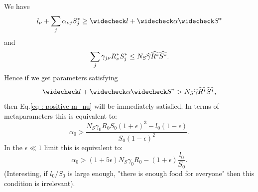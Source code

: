 \documentclass[12pt, titlepage]{report}
\begin{document}
We have
\begin{equation}
  l_\nu + \sum_{j} \alpha_{\nu j} S^*_j \geq \mind{l} + \mind{\alpha} \mind{S^*}
\end{equation}
and
\begin{equation}
  \sum_j \gamma_{j\nu}R^*_\nu S^*_j \leq N_S \widehat{\gamma}\widehat{R^*}\widehat{S^*}.
\end{equation}
Hence if we get parameters satisfying
\begin{equation}
  \mind{l}+\mind{\alpha}\mind{S^*} > N_S \maxd{\gamma}\maxd{R^*}\maxd{S^*},
\end{equation}
then Eq.\eqref{eq : positive m_nu} will be immediately satisfied. In terms of metaparameters this is equivalent to:
\begin{equation}
  \alpha_0 > \frac{N_S \gamma_0 R_0 S_0 (1+\epsilon)^3-l_0 (1-\epsilon)}{S_0 (1-\epsilon)^2}.\label{eq : alpha lowerbound 0}
\end{equation}
In the $\epsilon \ll 1$ limit this is equivalent to:
\begin{equation}
  \alpha_0 > \left(1+5\epsilon\right)N_S \gamma_0 R_0 - \left(1+\epsilon\right)\frac{l_0}{S_0}.
\end{equation}
(Interesting, if $l_0/S_0$ is large enough, \ie "there is enough food for everyone" then this condition is irrelevant).
\end{document}
